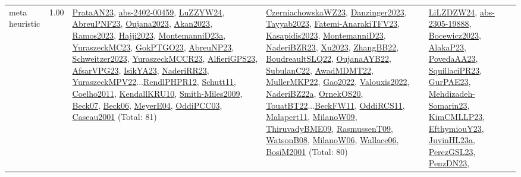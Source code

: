 {\begin{longtable}{p{3cm}r>{\raggedright\arraybackslash}p{6cm}>{\raggedright\arraybackslash}p{6cm}>{\raggedright\arraybackslash}p{8cm}}
\index{meta heuristic}\index{Algorithms!meta heuristic}meta heuristic &  1.00 & \hyperref[detail:PrataAN23]{PrataAN23}, \hyperref[detail:abs-2402-00459]{abs-2402-00459}, \hyperref[detail:LuZZYW24]{LuZZYW24}, \hyperref[detail:AbreuPNF23]{AbreuPNF23}, \hyperref[detail:Oujana2023]{Oujana2023}, \hyperref[detail:Akan2023]{Akan2023}, \hyperref[detail:Ramos2023]{Ramos2023}, \hyperref[detail:Hajji2023]{Hajji2023}, \hyperref[detail:MontemanniD23a]{MontemanniD23a}, \hyperref[detail:YuraszeckMC23]{YuraszeckMC23}, \hyperref[detail:GokPTGO23]{GokPTGO23}, \hyperref[detail:AbreuNP23]{AbreuNP23}, \hyperref[detail:Schweitzer2023]{Schweitzer2023}, \hyperref[detail:YuraszeckMCCR23]{YuraszeckMCCR23}, \hyperref[detail:AlfieriGPS23]{AlfieriGPS23}, \hyperref[detail:AfsarVPG23]{AfsarVPG23}, \hyperref[detail:IsikYA23]{IsikYA23}, \hyperref[detail:NaderiRR23]{NaderiRR23}, \hyperref[detail:YuraszeckMPV22]{YuraszeckMPV22}...\hyperref[detail:RendlPHPR12]{RendlPHPR12}, \hyperref[detail:Schutt11]{Schutt11}, \hyperref[detail:Coelho2011]{Coelho2011}, \hyperref[detail:KendallKRU10]{KendallKRU10}, \hyperref[detail:Smith-Miles2009]{Smith-Miles2009}, \hyperref[detail:Beck07]{Beck07}, \hyperref[detail:Beck06]{Beck06}, \hyperref[detail:MeyerE04]{MeyerE04}, \hyperref[detail:OddiPCC03]{OddiPCC03}, \hyperref[detail:Caseau2001]{Caseau2001} (Total: 81) & \hyperref[detail:CzerniachowskaWZ23]{CzerniachowskaWZ23}, \hyperref[detail:Danzinger2023]{Danzinger2023}, \hyperref[detail:Tayyab2023]{Tayyab2023}, \hyperref[detail:Fatemi-AnarakiTFV23]{Fatemi-AnarakiTFV23}, \hyperref[detail:Kasapidis2023]{Kasapidis2023}, \hyperref[detail:MontemanniD23]{MontemanniD23}, \hyperref[detail:NaderiBZR23]{NaderiBZR23}, \hyperref[detail:Xu2023]{Xu2023}, \hyperref[detail:ZhangBB22]{ZhangBB22}, \hyperref[detail:BoudreaultSLQ22]{BoudreaultSLQ22}, \hyperref[detail:OujanaAYB22]{OujanaAYB22}, \hyperref[detail:SubulanC22]{SubulanC22}, \hyperref[detail:AwadMDMT22]{AwadMDMT22}, \hyperref[detail:MullerMKP22]{MullerMKP22}, \hyperref[detail:Gao2022]{Gao2022}, \hyperref[detail:Valouxis2022]{Valouxis2022}, \hyperref[detail:NaderiBZ22a]{NaderiBZ22a}, \hyperref[detail:OrnekOS20]{OrnekOS20}, \hyperref[detail:TouatBT22]{TouatBT22}...\hyperref[detail:BeckFW11]{BeckFW11}, \hyperref[detail:OddiRCS11]{OddiRCS11}, \hyperref[detail:Malapert11]{Malapert11}, \hyperref[detail:MilanoW09]{MilanoW09}, \hyperref[detail:ThiruvadyBME09]{ThiruvadyBME09}, \hyperref[detail:RasmussenT09]{RasmussenT09}, \hyperref[detail:WatsonB08]{WatsonB08}, \hyperref[detail:MilanoW06]{MilanoW06}, \hyperref[detail:Wallace06]{Wallace06}, \hyperref[detail:BosiM2001]{BosiM2001} (Total: 80) & \hyperref[detail:LiLZDZW24]{LiLZDZW24}, \hyperref[detail:abs-2305-19888]{abs-2305-19888}, \hyperref[detail:Bocewicz2023]{Bocewicz2023}, \hyperref[detail:AlakaP23]{AlakaP23}, \hyperref[detail:PovedaAA23]{PovedaAA23}, \hyperref[detail:SquillaciPR23]{SquillaciPR23}, \hyperref[detail:GurPAE23]{GurPAE23}, \hyperref[detail:Mehdizadeh-Somarin23]{Mehdizadeh-Somarin23}, \hyperref[detail:KimCMLLP23]{KimCMLLP23}, \hyperref[detail:EfthymiouY23]{EfthymiouY23}, \hyperref[detail:JuvinHL23a]{JuvinHL23a}, \hyperref[detail:PerezGSL23]{PerezGSL23}, \hyperref[detail:PenzDN23]{PenzDN23}, 
\end{longtable}}
